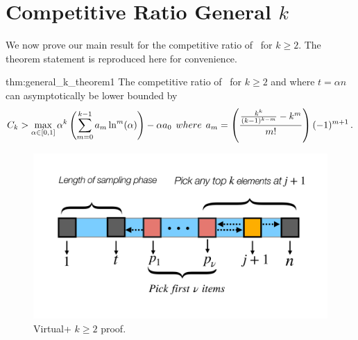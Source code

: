 \section{Competitive Ratio General $k$}
\label{app:general_k_proof}
We now prove our main result for the competitive ratio of \algoname \ for $k \geq 2$. The theorem statement is reproduced here for convenience.  
\begin{reptheorem}{thm:general_k_theorem1}
The competitive ratio of \algoname\ for $k \geq 2$ and where $t = \alpha n$ can asymptotically be lower bounded by 
\begin{equation}
    C_k >  \max_{\alpha \in [0,1]}  {\alpha}^k \left(\sum_{m = 0}^{k - 1} a_m \ln^m (\alpha)\right) - \alpha a_0
    \hspace{0.15cm }where  \hspace{0.15cm }
    a_m = \left(\frac{\frac{k^k}{(k-1)^{k-m}} - k^m}{m!}\right)(-1)^{m+1}
    \, .
\end{equation}

\end{reptheorem}
\begin{figure}[ht]
    \centering
    \includegraphics[width=1.0\linewidth]{Figures/general_k.pdf}
    \caption{Virtual+ $k \geq 2$ proof.}
    \label{fig:general_k}
    \vspace{-15pt}
\end{figure}
